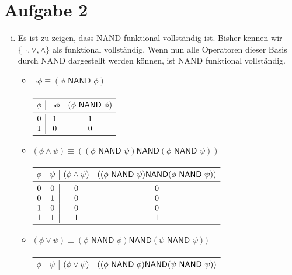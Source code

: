 \documentclass[a4paper,10pt]{article}
\begin{document}
\section*{Aufgabe 2}
\begin{enumerate}[(i)]
\item Es ist zu zeigen, dass \textsf{NAND} funktional vollständig ist. Bisher kennen wir $\{\lnot, \lor, \land\}$ als funktional vollständig. Wenn nun alle Operatoren dieser Basis durch \textsf{NAND} dargestellt werden können, ist \textsf{NAND} funktional vollständig.
\begin{itemize}
\item $\lnot\phi \equiv (\phi \textsf{ NAND } \phi)$ \\
\\
\begin{math}
\begin{array}{c|cc}
\toprule 
\phi & \lnot \phi & (\phi \textsf{ NAND } \phi) \\
\midrule
0 & 1 & 1 \\
1 & 0 & 0 \\
\bottomrule
\end{array}
\end{math}
\\
\item $(\phi \land \psi) \equiv ((\phi \textsf{ NAND } \psi) \textsf{NAND} (\phi \textsf{ NAND } \psi))$\\
\\
\begin{math}
\begin{array}{cc|cc}
\toprule 
\phi & \psi & (\phi \land  \psi) & ((\phi \textsf{ NAND } \psi) \textsf{NAND} (\phi \textsf{ NAND } \psi))  \\
\midrule
0 & 0 & 0 & 0 \\
0 & 1 & 0 & 0 \\
1 & 0 & 0 & 0 \\
1 & 1 & 1 & 1 \\
\bottomrule
\end{array}
\end{math}
\\
\item $(\phi \lor \psi) \equiv (\phi \textsf{ NAND } \phi) \textsf{NAND} (\psi \textsf{ NAND } \psi))$\\
\\
\begin{math}
\begin{array}{cc|cc}
\toprule 
\phi & \psi & (\phi \lor  \psi) & ((\phi \textsf{ NAND } \phi) \textsf{NAND} (\psi \textsf{ NAND } \psi)) \\

\end{array}
\end{math}
\end{itemize}
\end{enumerate}
\end{document}
